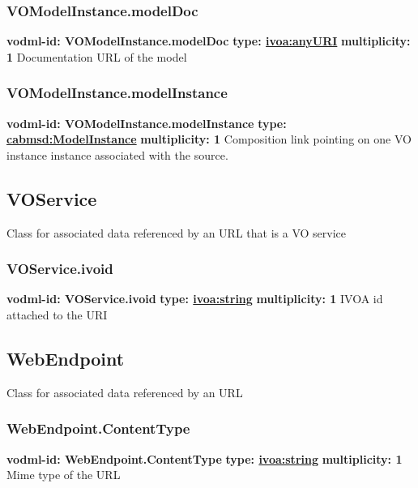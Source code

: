     \subsubsection{VOModelInstance.modelDoc}
      \textbf{vodml-id: VOModelInstance.modelDoc} \newline
      \textbf{type: \hyperref[sect:ivoa]{ivoa:anyURI}} \newline
      \textbf{multiplicity: 1} \newline 
      Documentation URL of the model

    \subsubsection{VOModelInstance.modelInstance}
      \textbf{vodml-id: VOModelInstance.modelInstance} \newline
      \textbf{type: \hyperref[sect:ModelInstance]{cabmsd:ModelInstance}} \newline
      \textbf{multiplicity: 1} \newline 
      Composition link pointing on one VO instance instance associated with the source.

  \subsection{VOService}
  \label{sect:VOService}
    Class for associated data referenced by an URL that is a VO service

    \subsubsection{VOService.ivoid}
      \textbf{vodml-id: VOService.ivoid} \newline
      \textbf{type: \hyperref[sect:ivoa]{ivoa:string}} \newline
      \textbf{multiplicity: 1} \newline 
      IVOA id attached to the URI

  \subsection{WebEndpoint}
  \label{sect:WebEndpoint}
    Class for associated data referenced by an URL

    \subsubsection{WebEndpoint.ContentType}
      \textbf{vodml-id: WebEndpoint.ContentType} \newline
      \textbf{type: \hyperref[sect:ivoa]{ivoa:string}} \newline
      \textbf{multiplicity: 1} \newline 
      Mime type of the URL

